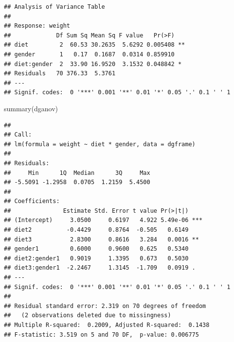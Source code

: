 \documentclass[
]{article}
\newenvironment{Shaded}{\begin{snugshade}}{\end{snugshade}}
\newcommand{\AttributeTok}[1]{\textcolor[rgb]{0.77,0.63,0.00}{#1}}
\newcommand{\FunctionTok}[1]{\textcolor[rgb]{0.00,0.00,0.00}{#1}}
\newcommand{\NormalTok}[1]{#1}
\newcommand{\OtherTok}[1]{\textcolor[rgb]{0.56,0.35,0.01}{#1}}
\newcommand{\SpecialCharTok}[1]{\textcolor[rgb]{0.00,0.00,0.00}{#1}}
\begin{document}
\begin{Shaded}
\end{Shaded}

\begin{verbatim}
## Analysis of Variance Table
## 
## Response: weight
##             Df Sum Sq Mean Sq F value   Pr(>F)   
## diet         2  60.53 30.2635  5.6292 0.005408 **
## gender       1   0.17  0.1687  0.0314 0.859910   
## diet:gender  2  33.90 16.9520  3.1532 0.048842 * 
## Residuals   70 376.33  5.3761                    
## ---
## Signif. codes:  0 '***' 0.001 '**' 0.01 '*' 0.05 '.' 0.1 ' ' 1
\end{verbatim}

\begin{Shaded}
\begin{Highlighting}[]
\FunctionTok{summary}\NormalTok{(dganov)}
\end{Highlighting}
\end{Shaded}

\begin{verbatim}
## 
## Call:
## lm(formula = weight ~ diet * gender, data = dgframe)
## 
## Residuals:
##     Min      1Q  Median      3Q     Max 
## -5.5091 -1.2958  0.0705  1.2159  5.4500 
## 
## Coefficients:
##               Estimate Std. Error t value Pr(>|t|)    
## (Intercept)     3.0500     0.6197   4.922 5.49e-06 ***
## diet2          -0.4429     0.8764  -0.505   0.6149    
## diet3           2.8300     0.8616   3.284   0.0016 ** 
## gender1         0.6000     0.9600   0.625   0.5340    
## diet2:gender1   0.9019     1.3395   0.673   0.5030    
## diet3:gender1  -2.2467     1.3145  -1.709   0.0919 .  
## ---
## Signif. codes:  0 '***' 0.001 '**' 0.01 '*' 0.05 '.' 0.1 ' ' 1
## 
## Residual standard error: 2.319 on 70 degrees of freedom
##   (2 observations deleted due to missingness)
## Multiple R-squared:  0.2009, Adjusted R-squared:  0.1438 
## F-statistic: 3.519 on 5 and 70 DF,  p-value: 0.006775
\end{verbatim}
\end{document}

